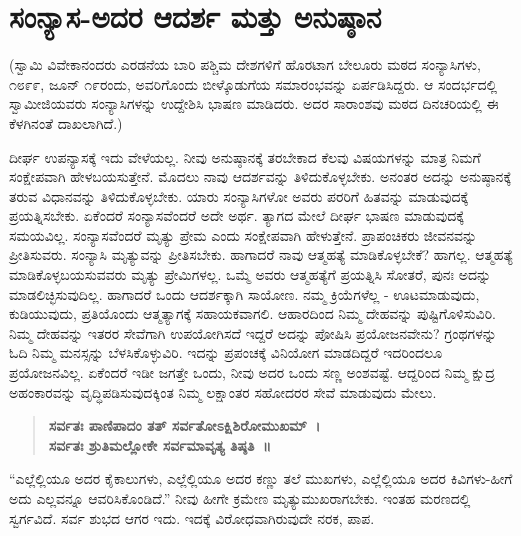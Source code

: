 
\chapter{ಸಂನ್ಯಾಸ-ಅದರ ಆದರ್ಶ ಮತ್ತು ಅನುಷ್ಠಾನ}

(ಸ್ವಾಮಿ ವಿವೇಕಾನಂದರು ಎರಡನೆಯ ಬಾರಿ ಪಶ್ಚಿಮ ದೇಶಗಳಿಗೆ ಹೊರಟಾಗ ಬೇಲೂರು ಮಠದ ಸಂನ್ಯಾಸಿಗಳು, ೧೮೯೯, ಜೂನ್​ ೧೯ರಂದು, ಅವರಿಗೊಂದು ಬೀಳ್ಕೊಡುಗೆಯ ಸಮಾರಂಭವನ್ನು ಏರ್ಪಡಿಸಿದ್ದರು. ಆ ಸಂದರ್ಭದಲ್ಲಿ ಸ್ವಾಮೀಜಿಯವರು ಸಂನ್ಯಾಸಿಗಳನ್ನು ಉದ್ದೇಶಿಸಿ ಭಾಷಣ ಮಾಡಿದರು. ಅದರ ಸಾರಾಂಶವು ಮಠದ ದಿನಚರಿಯಲ್ಲಿ ಈ ಕೆಳಗಿನಂತೆ ದಾಖಲಾಗಿದೆ.)

ದೀರ್ಘ ಉಪನ್ಯಾಸಕ್ಕೆ ಇದು ವೇಳೆಯಲ್ಲ. ನೀವು ಅನುಷ್ಠಾನಕ್ಕೆ ತರಬೇಕಾದ ಕೆಲವು ವಿಷಯಗಳನ್ನು ಮಾತ್ರ ನಿಮಗೆ ಸಂಕ್ಷೇಪವಾಗಿ ಹೇಳಬಯಸುತ್ತೇನೆ. ಮೊದಲು ನಾವು ಆದರ್ಶವನ್ನು ತಿಳಿದುಕೊಳ್ಳಬೇಕು. ಅನಂತರ ಅದನ್ನು ಅನುಷ್ಠಾನಕ್ಕೆ ತರುವ ವಿಧಾನವನ್ನು ತಿಳಿದುಕೊಳ್ಳಬೇಕು. ಯಾರು ಸಂನ್ಯಾಸಿಗಳೋ ಅವರು ಪರರಿಗೆ ಹಿತವನ್ನು ಮಾಡುವುದಕ್ಕೆ ಪ್ರಯತ್ನಿಸಬೇಕು. ಏಕೆಂದರೆ ಸಂನ್ಯಾಸವೆಂದರೆ ಅದೇ ಅರ್ಥ. ತ್ಯಾಗದ ಮೇಲೆ ದೀರ್ಘ ಭಾಷಣ ಮಾಡುವುದಕ್ಕೆ ಸಮಯವಿಲ್ಲ. ಸಂನ್ಯಾಸವೆಂದರೆ ಮೃತ್ಯು ಪ್ರೇಮ ಎಂದು ಸಂಕ್ಷೇಪವಾಗಿ ಹೇಳುತ್ತೇನೆ. ಪ್ರಾಪಂಚಿಕರು ಜೀವನವನ್ನು ಪ್ರೀತಿಸುವರು. ಸಂನ್ಯಾಸಿ ಮೃತ್ಯುವನ್ನು ಪ್ರೀತಿಸಬೇಕು. ಹಾಗಾದರೆ ನಾವು ಆತ್ಮಹತ್ಯೆ ಮಾಡಿಕೊಳ್ಳಬೇಕೆ? ಹಾಗಲ್ಲ. ಆತ್ಮಹತ್ಯೆ ಮಾಡಿಕೊಳ್ಳಬಯಸುವವರು ಮೃತ್ಯು ಪ್ರೇಮಿಗಳಲ್ಲ. ಒಮ್ಮೆ ಅವರು ಆತ್ಮಹತ್ಯೆಗೆ ಪ್ರಯತ್ನಿಸಿ ಸೋತರೆ, ಪುನಃ ಅದನ್ನು ಮಾಡಲಿಚ್ಛಿಸುವುದಿಲ್ಲ. ಹಾಗಾದರೆ ಒಂದು ಆದರ್ಶಕ್ಕಾಗಿ ಸಾಯೋಣ. ನಮ್ಮ ಕ್ರಿಯೆಗಳೆಲ್ಲ - ಊಟಮಾಡುವುದು, ಕುಡಿಯುವುದು, ಪ್ರತಿಯೊಂದು ಆತ್ಮತ್ಯಾಗಕ್ಕೆ ಸಹಾಯಕವಾಗಲಿ. ಆಹಾರದಿಂದ ನಿಮ್ಮ ದೇಹವನ್ನು ಪುಷ್ಟಿಗೊಳಿಸುವಿರಿ. ನಿಮ್ಮ ದೇಹವನ್ನು ಇತರರ ಸೇವೆಗಾಗಿ ಉಪಯೋಗಿಸದೆ ಇದ್ದರೆ ಅದನ್ನು ಪೋಷಿಸಿ ಪ್ರಯೋಜನವೇನು? ಗ್ರಂಥಗಳನ್ನು ಓದಿ ನಿಮ್ಮ ಮನಸ್ಸನ್ನು ಬೆಳಸಿಕೊಳ್ಳುವಿರಿ. ಇದನ್ನು ಪ್ರಪಂಚಕ್ಕೆ ವಿನಿಯೋಗ ಮಾಡದಿದ್ದರೆ ಇದರಿಂದಲೂ ಪ್ರಯೋಜನವಿಲ್ಲ. ಏಕೆಂದರೆ ಇಡೀ ಜಗತ್ತೇ ಒಂದು, ನೀವು ಅದರ ಒಂದು ಸಣ್ಣ ಅಂಶವಷ್ಟೆ. ಆದ್ದರಿಂದ ನಿಮ್ಮ ಕ್ಷುದ್ರ ಅಹಂಕಾರವನ್ನು ವೃದ್ಧಿಪಡಿಸುವುದಕ್ಕಿಂತ ನಿಮ್ಮ ಲಕ್ಷಾಂತರ ಸಹೋದರರ ಸೇವೆ ಮಾಡುವುದು ಮೇಲು.

\begin{verse}
\textbf{ಸರ್ವತಃ ಪಾಣಿಪಾದಂ ತತ್​ ಸರ್ವತೋಽಕ್ಷಿಶಿರೋಮುಖಮ್​~।}\\\textbf{ಸರ್ವತಃ ಶ್ರುತಿಮಲ್ಲೋಕೇ ಸರ್ವಮಾವೃತ್ಯ ತಿಷ್ಠತಿ~॥}
\end{verse}

“ಎಲ್ಲೆಲ್ಲಿಯೂ ಅದರ ಕೈಕಾಲುಗಳು, ಎಲ್ಲೆಲ್ಲಿಯೂ ಅದರ ಕಣ್ಣು ತಲೆ ಮುಖಗಳು, ಎಲ್ಲೆಲ್ಲಿಯೂ ಅದರ ಕಿವಿಗಳು-ಹೀಗೆ ಅದು ಎಲ್ಲವನ್ನೂ ಆವರಿಸಿಕೊಂಡಿದೆ.” ನೀವು ಹೀಗೇ ಕ್ರಮೇಣ ಮೃತ್ಯುಮುಖರಾಗಬೇಕು. ಇಂತಹ ಮರಣದಲ್ಲಿ ಸ್ವರ್ಗವಿದೆ. ಸರ್ವ ಶುಭದ ಆಗರ ಇದು. ಇದಕ್ಕೆ ವಿರೋಧವಾಗಿರುವುದೇ ನರಕ, ಪಾಪ.

